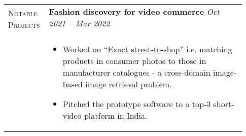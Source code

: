 \documentclass[letterpaper, 10pt, oneside]{article}
\newcommand{\stitle}[1]{\normalsize{\textsc{#1}}}
\newcommand{\bdit}[1]{{\textbf{#1}}}
\begin{document}
\begin{longtable}{@{} p{0.13\linewidth} p{0.8\linewidth}}
    \multirow{2}{6.5em}{\stitle{Notable Projects}}    
    & \bdit{Fashion discovery for video commerce} \hfill \textsl{Oct 2021 -- Mar 2022}                                                                                                                      \\
                                                      &                                                                                                                                                                                                       \\[-4ex]
                                                      & \parbox{0.8\textwidth}{                                                                                                                                                                               %
        \begin{itemize}[leftmargin=*, itemsep=-0.88ex, topsep=1.3ex]
            \item Worked on  ``\href{https://openaccess.thecvf.com/content_iccv_2015/papers/Kiapour_Where_to_Buy_ICCV_2015_paper.pdf}{Exact street-to-shop}''
                  i.e. matching products in consumer photos to those in manufacturer catalogues - a cross-domain image-based image retrieval problem.
            \item Pitched the prototype software to a top-3 short-video platform in India.
        \end{itemize}
    }
    \\



\end{longtable}
\end{document}
